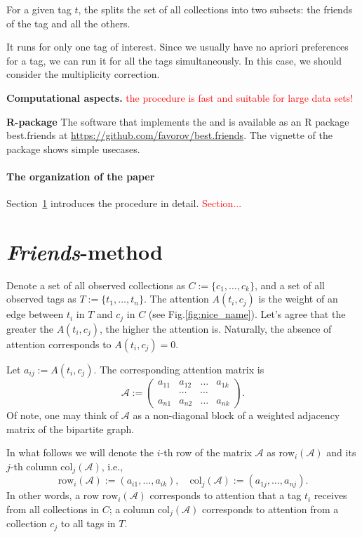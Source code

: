 \documentclass{llncs}
\begin{document}
For a given tag $t$, the  splits the set of all collections into two subsets: the friends of the tag and all the others. 

It runs for only one tag of interest. Since we usually have no apriori preferences for a tag, we can run it for all the tags simultaneously. In this case, we should consider the multiplicity correction. 

\textbf{Computational aspects.} \textcolor{red}{the procedure is fast and suitable for large data sets!}

\textbf{R-package}
The software that implements the  and  is available as an \textsf{R} package \textsf{best.friends} at 
\url{https://github.com/favorov/best.friends}. The vignette of the package shows simple usecases.


\paragraph{The organization of the paper} Section~\ref{sec:method} introduces the procedure in detail. \textcolor{red}{Section...}

\section{\textit{Friends}-method}
\label{sec:method}
Denote a set of all observed collections as $C := \{c_1, \dots, c_k\}$, and a set of all observed tags as $T := \{t_1, \dots, t_n\}$.
The attention $A(t_i, c_j)$ is the weight of an edge between $t_i$ in $ T$ and $c_j$ in $C$ (see Fig.\ref{fig:nice_name}).
Let's agree that the greater the $A(t_i, c_j)$, the higher the attention is. Naturally, the absence of attention corresponds to $A(t_i, c_j) = 0$. 

Let $a_{ij} := A(t_i, c_j)$. The corresponding attention matrix is 
\[
\mathcal{A} := \begin{pmatrix}
a_{11} & a_{12} & \dots & a_{1k} \\
 &\cdots & \cdots & \\
a_{n1} & a_{n2} & \dots & a_{nk}
\end{pmatrix}.
\]
Of note, one may think of $\mathcal{A}$ as a non-diagonal block of a weighted adjacency matrix of the bipartite graph.

In what follows we will denote the $i$-th row of the matrix $\mathcal{A}$ as $\text{row}_i(\mathcal{A})$ and its $j$-th column $\text{col}_j(\mathcal{A})$, i.e.,
\[
\text{row}_i(\mathcal{A}) := (a_{i1}, \dots, a_{ik}),
\quad
\text{col}_j(\mathcal{A}) := (a_{1j}, \dots, a_{nj}).
\]
In other words, a row $\text{row}_i(\mathcal{A})$ corresponds to attention that a tag $t_i$ receives from all collections in $C$; a column $\text{col}_j(\mathcal{A})$ corresponds to attention from a collection $c_j$ to all tags in $T$.
\end{document}
